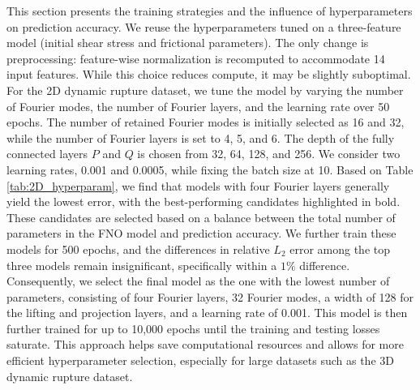 \documentclass[draft]{agujournal2019}
\begin{document}
This section presents the training strategies and the influence of hyperparameters on prediction accuracy. We reuse the hyperparameters tuned on a three-feature model (initial shear stress and frictional parameters). The only change is preprocessing: feature-wise normalization is recomputed to accommodate 14 input features. While this choice reduces compute, it may be slightly suboptimal. For the 2D dynamic rupture dataset, we tune the model by varying the number of Fourier modes, the number of Fourier layers, and the learning rate over 50 epochs. The number of retained Fourier modes is initially selected as 16 and 32, while the number of Fourier layers is set to 4, 5, and 6. The depth of the fully connected layers \(P\) and \(Q\) is chosen from 32, 64, 128, and 256. We consider two learning rates, 0.001 and 0.0005, while fixing the batch size at 10. Based on Table \ref{tab:2D_hyperparam}, we find that models with four Fourier layers generally yield the lowest error, with the best-performing candidates highlighted in bold. These candidates are selected based on a balance between the total number of parameters in the FNO model and prediction accuracy. We further train these models for 500 epochs, and the differences in relative \(L_2\) error among the top three models remain insignificant, specifically within a \(1\%\) difference. Consequently, we select the final model as the one with the lowest number of parameters, consisting of four Fourier layers, 32 Fourier modes, a width of 128 for the lifting and projection layers, and a learning rate of 0.001. This model is then further trained for up to 10,000 epochs until the training and testing losses saturate. This approach helps save computational resources and allows for more efficient hyperparameter selection, especially for large datasets such as the 3D dynamic rupture dataset. 
\end{document}
